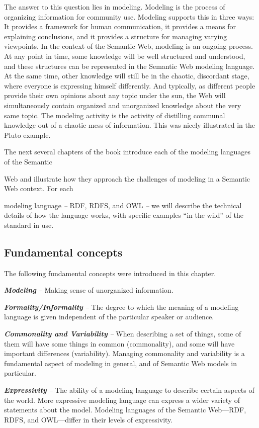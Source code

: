 The answer to this question lies in modeling. Modeling is the process of
organizing information for community use. Modeling supports this in
three ways: It provides a framework for human communication, it provides
a means for explaining conclusions, and it provides a structure for
managing varying viewpoints. In the context of the Semantic Web,
modeling is an ongoing process. At any point in time, some knowledge
will be well structured and understood, and these structures can be
represented in the Semantic Web modeling language. At the same time,
other knowledge will still be in the chaotic, discordant stage, where
everyone is expressing himself differently. And typically, as different
people provide their own opinions about any topic under the sun, the Web
will simultaneously contain organized and unorganized knowledge about
the very same topic. The modeling activity is the activity of distilling
communal knowledge out of a chaotic mess of information. This was nicely
illustrated in the Pluto example.

The next several chapters of the book introduce each of the modeling
languages of the Semantic

Web and illustrate how they approach the challenges of modeling in a
Semantic Web context. For each

modeling language \emph{--} RDF, RDFS, and OWL \emph{--} we will
describe the technical details of how the language works, with specific
examples ``in the wild'' of the standard in use.

\subsection{Fundamental concepts}

The following fundamental concepts were introduced in this chapter.

\emph{\textbf{Modeling}} \emph{--} Making sense of unorganized
information.

\emph{\textbf{Formality/Informality}} \emph{--} The degree to which the
meaning of a modeling language is given independent of the particular
speaker or audience.

\emph{\textbf{Commonality and Variability}} \emph{--} When describing a
set of things, some of them will have some things in common
(commonality), and some will have important differences (variability).
Managing commonality and variability is a fundamental aspect of modeling
in general, and of Semantic Web models in particular.

\emph{\textbf{Expressivity}} \emph{--} The ability of a modeling
language to describe certain aspects of the world. More expressive
modeling language can express a wider variety of statements about the
model. Modeling languages of the Semantic Web---RDF, RDFS, and
OWL---differ in their levels of expressivity.
